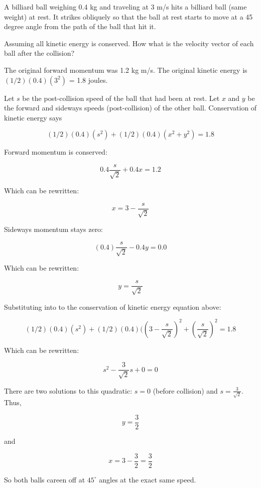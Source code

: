 \begin{Exercise}[title={Billiard Balls}, label=billiards]
  
A billiard ball weighing 0.4 kg and traveling at 3 m/s hits a billiard
ball (same weight) at rest. It strikes obliquely so that the ball at rest starts to
move at a 45 degree angle from the path of the ball that hit it.

Assuming all kinetic energy is conserved. How what is the velocity
vector of each ball after the collision?

\end{Exercise}
\begin{Answer}[ref=billiards]

  The original forward momentum was 1.2 kg m/s.  The original kinetic energy is $(1/2)(0.4)(3^2)$ = 1.8 joules. 

  Let $s$ be the post-collision speed of the ball that had been at
  rest.  Let $x$ and $y$ be the forward and sideways speeds
  (post-collision) of the other ball. Conservation of kinetic energy says

  $$(1/2)(0.4)(s^2) + (1/2)(0.4)(x^2+y^2) = 1.8$$

  Forward momentum is conserved:

  $$0.4\frac{s}{\sqrt{2}} + 0.4 x = 1.2$$

  Which can be rewritten:

  $$x = 3 - \frac{s}{\sqrt{2}}$$
  
  Sideways momentum stays zero:

  $$(0.4)\frac{s}{\sqrt{2}} - 0.4 y = 0.0$$

  Which can be rewritten:

  $$y = \frac{s}{\sqrt{2}}$$

  Substituting into to the conservation of kinetic energy equation above:

  $$(1/2)(0.4)(s^2) + (1/2)(0.4)(\left(3 - \frac{s}{\sqrt{2}}\right)^2+\left(\frac{s}{\sqrt{2}}\right)^2 = 1.8$$

  Which can be rewritten:

  $$s^2 - \frac{3}{\sqrt{2}} s + 0 = 0$$

  There are two solutions to this quadratic: $s = 0$ (before collision) and $s = \frac{3}{\sqrt{2}}$. Thus,

  $$y = \frac{3}{2}$$

  and

  $$x = 3 - \frac{3}{2} = \frac{3}{2}$$

  So both balls careen off at $45^\circ$ angles at the exact same speed. 

  
\end{Answer}



